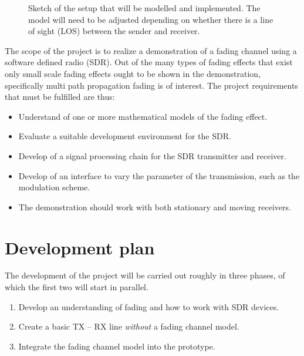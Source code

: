 \documentclass[a4paper, twosided, 11pt]{scrartcl}
\begin{document}
\begin{figure}[h]
	\caption[
		Sketch of the setup that will be modelled and implemented.
	]{ Sketch of the setup that will be modelled and implemented.
		The model will need to be adjusted depending on whether there is a line of sight (LOS) between the sender and receiver.
	}
\end{figure}

The scope of the project is to realize a demonstration of a fading channel using a software defined radio (SDR).
Out of the many types of fading effects that exist only small scale fading effects ought to be shown in the demonstration, specifically multi path propagation fading is of interest.
The project requirements that must be fulfilled are thus:
\begin{itemize}
	\item Understand of one or more mathematical models of the fading effect.
	\item Evaluate a suitable development environment for the SDR.
	\item Develop of a signal processing chain for the SDR transmitter and receiver.
	\item Develop of an interface to vary the parameter of the transmission, such as the modulation scheme.
	\item The demonstration should work with both stationary and moving receivers.
\end{itemize}

\section{Development plan}

The development of the project will be carried out roughly in three phases, of which the first two will start in parallel.
\begin{enumerate}
	\item Develop an understanding of fading and how to work with SDR devices.
	\item Create a basic TX -- RX line \emph{without} a fading channel model.
	\item Integrate the fading channel model into the prototype.
\end{enumerate}
\end{document}
